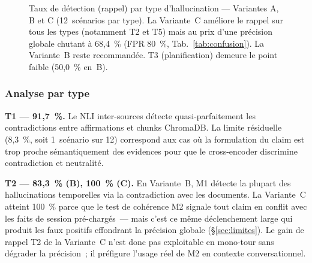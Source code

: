 \documentclass[12pt,a4paper]{article}
\begin{document}
\begin{figure}[H]
\centering
{}
\caption{Taux de détection (rappel) par type d'hallucination --- Variantes A, B et C (12~scénarios par type). La Variante~C améliore le rappel sur tous les types (notamment T2 et T5) mais au prix d'une précision globale chutant à 68,4~\% (FPR 80~\%, Tab.~\ref{tab:confusion}). La Variante~B reste recommandée. T3 (planification) demeure le point faible (50,0~\% en~B).}
\label{fig:detection_by_type}
\end{figure}

\subsubsection{Analyse par type}

\textbf{T1 --- 91,7~\%.} Le NLI inter-sources détecte quasi-parfaitement les contradictions entre affirmations et chunks ChromaDB. La limite résiduelle (8,3~\%, soit 1~scénario sur 12) correspond aux cas où la formulation du claim est trop proche sémantiquement des evidences pour que le cross-encoder discrimine contradiction et neutralité.

\textbf{T2 --- 83,3~\% (B), 100~\% (C).} En Variante~B, M1 détecte la plupart des hallucinations temporelles via la contradiction avec les documents. La Variante~C atteint 100~\% parce que le test de cohérence M2 signale tout claim en conflit avec les faits de session pré-chargés~--- mais c'est ce même déclenchement large qui produit les faux positifs effondrant la précision globale (§\ref{sec:limites}). Le gain de rappel T2 de la Variante~C n'est donc pas exploitable en mono-tour sans dégrader la précision~; il préfigure l'usage réel de M2 en contexte conversationnel.
\end{document}
